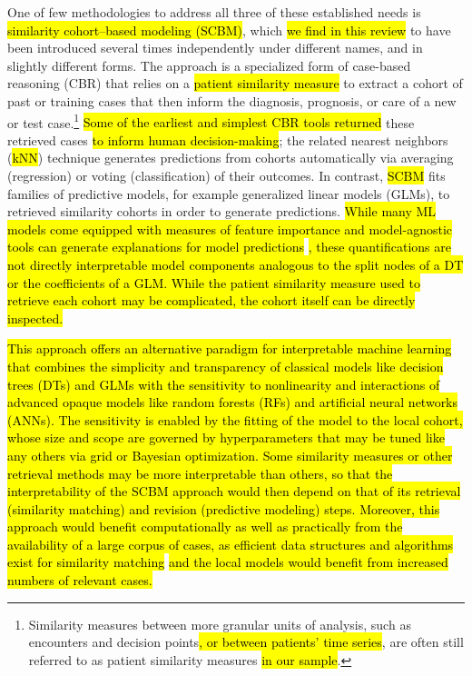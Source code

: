 \documentclass[sn-mathphys,Numbered,pdflatex]{sn-jnl}
\theoremstyle{remark}
\theoremstyle{definition}
\begin{document}
One of few methodologies to address all three of these established needs
is \hl{similarity cohort--based modeling (SCBM)}, which
\hl{we find in this review} to have been introduced several times
independently under different names, and in slightly different forms.
The approach is a specialized form of case-based reasoning (CBR) that
relies on a \hl{patient similarity measure }\citep{Brown2016} to extract
a cohort of past or training cases that then inform the diagnosis,
prognosis, or care of a new or test case.\footnote{Similarity measures
  between more granular units of analysis, such as encounters and
  decision points\hl{, or between patients' time series}, are often
  still referred to as patient similarity measures\hl{ in our sample}.}
\hl{Some of the earliest and simplest CBR tools returned} these
retrieved cases \hl{ to inform human decision-making}\citep{Aamodt1994};
the related nearest neighbors (\hl{kNN}) technique generates predictions from
cohorts automatically via averaging (regression) or voting
(classification) of their outcomes. In contrast, \hl{SCBM} fits families
of predictive models, for example generalized linear models (GLMs), to
retrieved similarity cohorts in order to generate predictions.
\hl{While many ML models come equipped with measures of feature importance and model-agnostic tools can generate explanations for model predictions }\citep{Molnar2023}\hl{, these quantifications are not directly interpretable model components analogous to the split nodes of a DT or the coefficients of a GLM.
While the patient similarity measure used to retrieve each cohort may be complicated, the cohort itself can be directly inspected.}

\hl{This approach offers an alternative paradigm for interpretable machine learning that combines the simplicity and transparency of classical models like decision trees (DTs) and GLMs with the sensitivity to nonlinearity and interactions of advanced opaque models like random forests (RFs) and artificial neural networks (ANNs). The sensitivity is enabled by the fitting of the model to the local cohort, whose size and scope are governed by hyperparameters that may be tuned like any others via grid or Bayesian optimization. Some similarity measures or other retrieval methods may be more interpretable than others, so that the interpretability of the SCBM approach would then depend on that of its retrieval (similarity matching) and revision (predictive modeling) steps. Moreover, this approach would benefit computationally as well as practically from the availability of a large corpus of cases, as efficient data structures and algorithms exist for similarity matching }\citep{Halder2024}\hl{ and the local models would benefit from increased numbers of relevant cases.}
\end{document}
